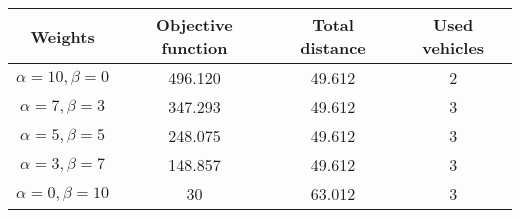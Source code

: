 {
\renewcommand{\arraystretch}{2}
\begin{longtable}[h]{| c | c | c | c |}
    \hline
    \textbf{Weights} & \textbf{Objective function} & \textbf{Total distance} & \textbf{Used vehicles} \\
    \hline
    \endhead
    $\alpha = 10, \beta = 0$ & 496.120 & 49.612 & 2 \\
    \hline
    $\alpha = 7, \beta = 3$  & 347.293 & 49.612 & 3 \\
    \hline
    $\alpha = 5, \beta = 5$  & 248.075 & 49.612 & 3 \\
    \hline
    $\alpha = 3, \beta = 7$  & 148.857 & 49.612 & 3 \\
    \hline
    $\alpha = 0, \beta = 10$ &      30 & 63.012 & 3 \\
    \hline
\end{longtable}
}